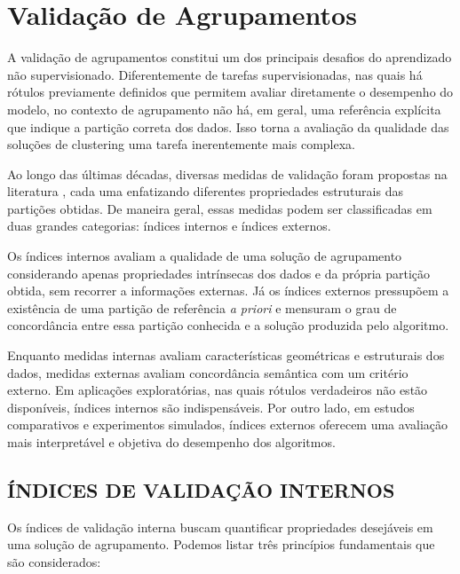 \section{Validação de Agrupamentos}

A validação de agrupamentos constitui um dos principais desafios do aprendizado não supervisionado. Diferentemente de tarefas supervisionadas, nas quais há rótulos previamente definidos que permitem avaliar diretamente o desempenho do modelo, no contexto de agrupamento não há, em geral, uma referência explícita que indique a partição correta dos dados. Isso torna a avaliação da qualidade das soluções de clustering uma tarefa inerentemente mais complexa.

Ao longo das últimas décadas, diversas medidas de validação foram propostas na literatura \cite{wu2020decision,WOS:000172252500002,WOS:000232704100004,deborah2010survey}, cada uma enfatizando diferentes propriedades estruturais das partições obtidas. De maneira geral, essas medidas podem ser classificadas em duas grandes categorias: índices internos e índices externos.

Os índices internos avaliam a qualidade de uma solução de agrupamento considerando apenas propriedades intrínsecas dos dados e da própria partição obtida, sem recorrer a informações externas. Já os índices externos pressupõem a existência de uma partição de referência \emph{a priori} e mensuram o grau de concordância entre essa partição conhecida e a solução produzida pelo algoritmo.

Enquanto medidas internas avaliam características geométricas e estruturais dos dados, medidas externas avaliam concordância semântica com um critério externo. Em aplicações exploratórias, nas quais rótulos verdadeiros não estão disponíveis, índices internos são indispensáveis. Por outro lado, em estudos comparativos e experimentos simulados, índices externos oferecem uma avaliação mais interpretável e objetiva do desempenho dos algoritmos.

\subsection{ÍNDICES DE VALIDAÇÃO INTERNOS}

Os índices de validação interna buscam quantificar propriedades desejáveis em uma solução de agrupamento. Podemos listar três princípios fundamentais que são considerados:

